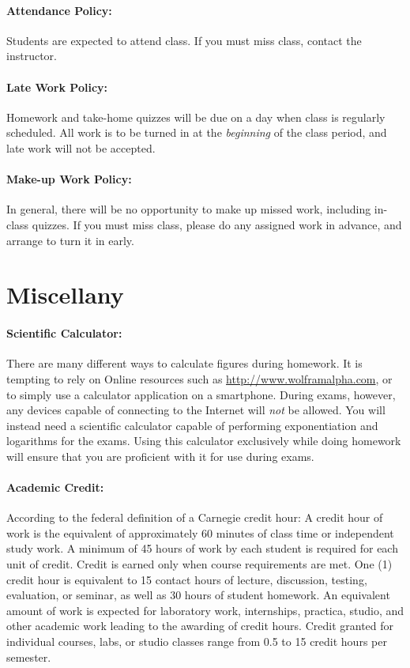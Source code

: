 \documentclass[12pt, letterpaper]{article}
\begin{document}
\paragraph{Attendance Policy:}
Students are expected to attend class. If you must miss class, contact the instructor.

\paragraph{Late Work Policy:}
Homework and take-home quizzes will be due on a day when class is regularly scheduled. All work is to be turned in at the \emph{beginning} of the class period, and late work will not be accepted.

\paragraph{Make-up Work Policy:}
In general, there will be no opportunity to make up missed work, including in-class quizzes. If you must miss class, please do any assigned work in advance, and arrange to turn it in early.

\section*{Miscellany}

\paragraph{Scientific Calculator:}
There are many different ways to calculate figures during homework. It is tempting to rely on Online resources such as \href{http://www.wolframalpha.com}{http://www.wolframalpha.com}, or to simply use a calculator application on a smartphone. During exams, however, any devices capable of connecting to the Internet will \emph{not} be allowed. You will instead need a scientific calculator capable of performing exponentiation and logarithms for the exams. Using this calculator exclusively while doing homework will ensure that you are proficient with it for use during exams.

\paragraph{Academic Credit:}
According to the federal definition of a Carnegie credit hour: A credit hour of work is the equivalent of approximately 60 minutes of class time or independent study work. A minimum of 45 hours of work by each student is required for each unit of credit. Credit is earned only when course requirements are met. One (1) credit hour is equivalent to 15 contact hours of lecture, discussion, testing, evaluation, or seminar, as well as 30 hours of student homework. An equivalent amount of work is expected for laboratory work, internships, practica, studio, and other academic work leading to the awarding of credit hours. Credit granted for individual courses, labs, or studio classes range from 0.5 to 15 credit hours per semester.
\end{document}
